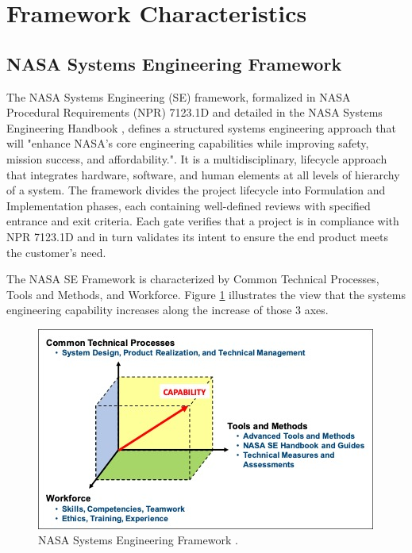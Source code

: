 \section{Framework Characteristics}
\label{sect:characteristics}
\subsection{NASA Systems Engineering Framework}
\label{sub:nasa}
The NASA Systems Engineering (SE) framework, formalized in NASA Procedural Requirements (NPR) 7123.1D \cite{npr7123.1D} and detailed in the NASA Systems Engineering Handbook \cite{nasa2016handbook}, defines a structured systems engineering approach that will "enhance NASA's core engineering capabilities while improving safety, mission success, and affordability."\cite{npr7123.1D}. It is a multidisciplinary, lifecycle approach that integrates hardware, software, and human elements at all levels of hierarchy of a system. The framework divides the project lifecycle into Formulation and Implementation phases, each containing well-defined reviews with specified entrance and exit criteria. Each gate verifies that a project is in compliance with NPR 7123.1D and in turn validates its intent to ensure the end product meets the customer's need.\cite{npr7123.1D}

The NASA SE Framework is characterized by Common Technical Processes, Tools and Methods, and Workforce. Figure \ref{fig:nasa_se_framework} illustrates the view that the systems engineering capability increases along the increase of those 3 axes. \\
\begin{figure}[h]
  \centering
  \includegraphics[width=0.7\linewidth]{figures/NPR7123.1DC1F4.jpg}
  \caption{NASA Systems Engineering Framework
  \cite{npr7123.1D}.}
  \label{fig:nasa_se_framework}
\end{figure}

